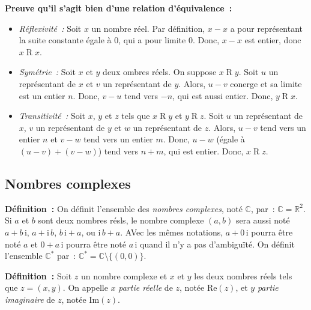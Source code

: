 \noindent\textbf{Preuve qu'il s'agit bien d'une relation d'équivalence :}
\begin{itemize}[nosep]
    \item \emph{Réflexivité :} Soit $x$ un nombre réel.
        Par définition, $x - x$ a pour représentant la suite constante égale à $0$, qui a pour limite $0$.
        Donc, $x - x$ est entier, donc $x \mathrel{R} x$.
    \item \emph{Symétrie :} Soit $x$ et $y$ deux ombres réels.
        On suppose $x \mathrel{R} y$. 
        Soit $u$ un représentant de $x$ et $v$ un représentant de $y$.
        Alors, $u - v$ conerge et sa limite est un entier $n$.
        Donc, $v - u$ tend vers $-n$, qui est aussi entier.
        Donc, $y \mathrel{R} x$.
    \item \emph{Transitivité :} Soit $x$, $y$ et $z$ tels que $x \mathrel{R} y$ et $y \mathrel{R} z$. 
        Soit $u$ un représentant de $x$, $v$ un représentant de $y$ et $w$ un représentant de $z$.
        Alors, $u - v$ tend vers un entier $n$ et $v - w$ tend vers un entier $m$.
        Donc, $u - w$ (égale à $(u - v) + (v - w)$) tend vers $n + m$, qui est entier.
        Donc, $x \mathrel{R} z$.
\end{itemize}

\done
 
\subsection{Nombres complexes}

\noindent\textbf{Définition :} 
    On définit l'ensemble des \emph{nombres complexes}, noté $\mathbb{C}$, par : $\mathbb{C} = \mathbb{R}^2$.
    Si $a$ et $b$ sont deux nombres résls, le nombre complexe $(a, b)$ sera aussi noté $a + b \, \mathrm{i}$, $a + \mathrm{i} \, b$, $b \, \mathrm{i} + a$, ou $\mathrm{i} \, b + a$.
    AVec les mêmes notations, $a + 0 \, \mathrm{i}$ pourra être noté $a$ et $0 + a \, \mathrm{i}$ pourra être noté $a \, \mathrm{i}$ quand il n'y a pas d'ambiguïté.
    On définit l'ensemble $\mathbb{C}^*$ par : $\mathbb{C}^* = \mathbb{C} \setminus \lbrace (0, 0) \rbrace$.

\medskip

\noindent\textbf{Définition :}   
    Soit $z$ un nombre complexe et $x$ et $y$ les deux nombres réels tels que $z = (x, y)$.
    On appelle $x$ \emph{partie réelle} de $z$, notée $\mathrm{Re}(z)$, et $y$ \emph{partie imaginaire} de $z$, notée $\mathrm{Im}(z)$.

